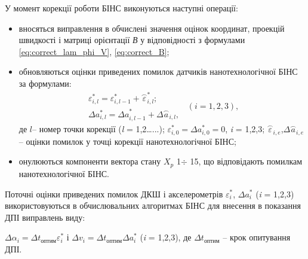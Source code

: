 У момент корекції роботи БІНС виконуються наступні операції:
\begin{itemize}
 \item вносяться виправлення  в обчислені значення оцінок координат, проекцій швидкості 
і матриці орієнтації \textit{В} у відповідності з формулами \eqref{eq:correct_lam_phi_V}, 
\eqref{eq:correct_B};
 \item обновляються оцінки приведених помилок датчиків нанотехнологічної БІНС  за формулами:
\[\begin{array}{l} 
{\varepsilon ^{*}_{i,l} =\varepsilon ^{*}_{i,l-1} +\stackrel{\frown}{\varepsilon 
}^{*}_{i,l} ;} \\ {\Delta a^{*}_{i,l} =\Delta a_{i,l-1} ^{*_{} } +\Delta \stackrel{
\frown}{a}_{i,l} ^{} ,} \end{array}\, \, \, (i=1,2,3),\] 
 де  $l$-- номер точки корекції (\textit{l} = 1,2\dots ...); 
$\varepsilon ^{*}_{i,0} =\Delta a^{*}_{i,0}=0$, \textit{i} = 1,2,3;
$\stackrel{\frown}{\varepsilon }_{i,e} $,$\Delta \stackrel{\frown}{a}_{i,e} $ -- оцінки 
помилок у точці корекції нанотехнологічної БІНС;
 \item онулюються компоненти вектора стану $X_{p}$ 1$\div$ 15, що відповідають помилкам 
нанотехнологічної БІНС.
\end{itemize}
Поточні оцінки приведених помилок ДКШ і акселерометрів $\varepsilon_{i}^{*} $, $\Delta 
a_{i}^{*} $ (\textit{i }= 1,2,3)  використовуються в обчислювальних алгоритмах 
БІНС для внесення в показання ДПІ виправлень виду:

$\Delta \alpha_{i} =\Delta t_{\text{оптим}} \varepsilon ^{*}_{i} $ і $\Delta v_{i} 
=\Delta t_{\text{оптим}} \Delta a^{*}_{i} $ (\textit{i }= 1,2,3),
де $\Delta t_{\text{оптим}} $ -- крок опитування ДПІ.

